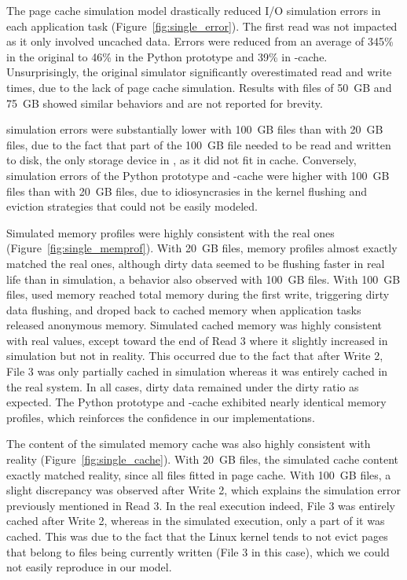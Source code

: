 The page cache simulation model drastically reduced I/O simulation
errors in each application task (Figure~\ref{fig:single_error}). The first read was not impacted
as it only involved uncached data. Errors were reduced from an average
of 345\% in the original \wrench to 46\% in the Python prototype and
39\% in \wrench-cache. Unsurprisingly, the original \wrench simulator
significantly overestimated read and write times, due to the lack
of page cache simulation. Results with files of 50~GB and 75~GB
showed similar behaviors and are not reported for brevity.

\wrench simulation errors were substantially lower with 100~GB
files than with 20~GB files, due to the fact that part of the
100~GB file needed to be read and written to disk, the only storage
device in \wrench, as it did not fit in cache. Conversely,
simulation errors of the Python prototype and \wrench-cache were higher with
100~GB files than with 20~GB files, due to idiosyncrasies in the kernel
flushing and eviction strategies that could not be easily modeled.

Simulated memory profiles were highly consistent with the real ones
(Figure~\ref{fig:single_memprof}). With 20~GB files, memory profiles almost exactly matched the
real ones, although dirty data seemed to be flushing faster in real
life than in simulation, a behavior also
observed with 100~GB files. With 100~GB files, used memory reached
total memory during the first write, triggering dirty data
flushing, and droped back to cached memory when application tasks
released anonymous memory. Simulated cached memory was highly
consistent with real values, except toward the end of Read 3 where
it slightly increased in simulation but not in reality. This
occurred due to the fact that after Write 2, File 3 was only partially
cached in simulation whereas it was entirely cached in the real
system. In all cases, dirty data remained under the dirty ratio as
expected. The Python prototype and \wrench-cache exhibited nearly
identical memory profiles, which reinforces the confidence in our
implementations.

The content of the simulated memory cache was also highly
consistent with reality (Figure~\ref{fig:single_cache}). With 20~GB
files, the simulated cache content exactly matched reality, since
all files fitted in page cache. With 100~GB files, a slight
discrepancy was observed after Write 2, which explains the
simulation error previously mentioned in Read 3. In the real
execution indeed, File 3 was entirely cached after Write 2, whereas
in the simulated execution, only a part of it was cached. This was
due to the fact that the Linux kernel tends to not evict pages that
belong to files being currently written (File 3 in this case),
which we could not easily reproduce in our model.

